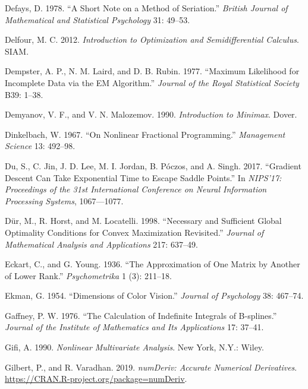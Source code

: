 \documentclass[
  12pt,
  letterpaper,
  DIV=11,
  numbers=noendperiod]{scrreprt}
\newlength{\cslhangindent}
\newenvironment{CSLReferences}[2] %
 {\begin{list}{}{%
  \setlength{\itemindent}{0pt}
  \setlength{\leftmargin}{0pt}
  \setlength{\parsep}{0pt}
  \ifodd #1
   \setlength{\leftmargin}{\cslhangindent}
   \setlength{\itemindent}{-1\cslhangindent}
  \fi
  \setlength{\itemsep}{#2\baselineskip}}}
 {\end{list}}
\theoremstyle{remark}
\begin{document}
\begin{CSLReferences}{1}{0}
Defays, D. 1978. {``{A Short Note on a Method of Seriation}.''}
\emph{British Journal of Mathematical and Statistical Psychology} 31:
49--53.

Delfour, M. C. 2012. \emph{Introduction to Optimization and
Semidifferential Calculus}. SIAM.

Dempster, A. P., N. M. Laird, and D. B. Rubin. 1977. {``{Maximum
Likelihood for Incomplete Data via the EM Algorithm}.''} \emph{Journal
of the Royal Statistical Society} B39: 1--38.

Demyanov, V. F., and V. N. Malozemov. 1990. \emph{Introduction to
Minimax}. Dover.

Dinkelbach, W. 1967. {``{On Nonlinear Fractional Programming}.''}
\emph{Management Science} 13: 492--98.

Du, S., C. Jin, J. D. Lee, M. I. Jordan, B. Póczos, and A. Singh. 2017.
{``{Gradient Descent Can Take Exponential Time to Escape Saddle
Points}.''} In \emph{NIPS'17: Proceedings of the 31st International
Conference on Neural Information Processing Systems}, 1067---1077.

Dür, M., R. Horst, and M. Locatelli. 1998. {``{Necessary and Sufficient
Global Optimality Conditions for Convex Maximization Revisited}.''}
\emph{Journal of Mathematical Analysis and Applications} 217: 637--49.

Eckart, C., and G. Young. 1936. {``{The Approximation of One Matrix by
Another of Lower Rank}.''} \emph{Psychometrika} 1 (3): 211--18.

Ekman, G. 1954. {``{Dimensions of Color Vision}.''} \emph{Journal of
Psychology} 38: 467--74.

Gaffney, P. W. 1976. {``{The Calculation of Indefinite Integrals of
B-splines}.''} \emph{Journal of the Institute of Mathematics and Its
Applications} 17: 37--41.

Gifi, A. 1990. \emph{Nonlinear Multivariate Analysis}. New York, N.Y.:
Wiley.

Gilbert, P., and R. Varadhan. 2019. \emph{{numDeriv: Accurate Numerical
Derivatives}}. \url{https://CRAN.R-project.org/package=numDeriv}.


\end{CSLReferences}
\end{document}
